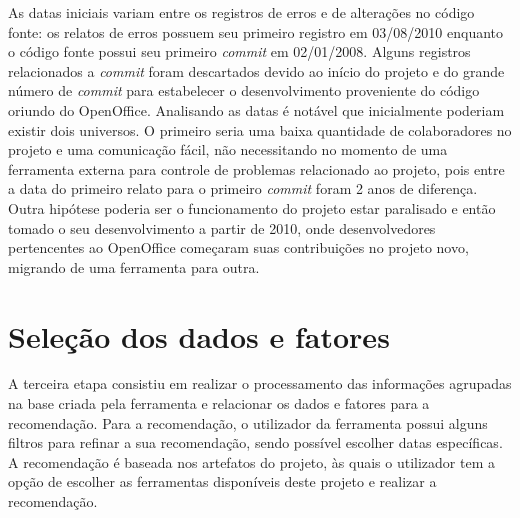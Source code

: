 \documentclass[oneside,brazil,a4paper]{normas-utf-tex}
\begin{document}
As datas iniciais variam entre os registros de erros e de alterações no código fonte: os relatos de erros possuem seu primeiro registro em 03/08/2010 enquanto o código fonte possui seu primeiro \textit{commit} em 02/01/2008. Alguns registros relacionados a \textit{commit} foram descartados devido ao início do projeto e do grande número de \textit{commit} para estabelecer o desenvolvimento proveniente do código oriundo do OpenOffice. Analisando as datas é notável que inicialmente poderiam existir dois universos. O primeiro seria uma baixa quantidade de colaboradores no projeto e uma comunicação fácil, não necessitando no momento de uma ferramenta externa para controle de problemas relacionado ao projeto, pois entre a data do primeiro relato para o primeiro \textit{commit} foram 2 anos de diferença. Outra hipótese poderia ser o funcionamento do projeto estar paralisado e então tomado o seu desenvolvimento a partir de 2010, onde desenvolvedores pertencentes ao OpenOffice começaram suas contribuições no projeto novo, migrando de uma ferramenta para outra.

\section{Seleção dos dados e fatores}

A terceira etapa consistiu em realizar o processamento das informações agrupadas na base criada pela ferramenta e relacionar os dados e fatores para a recomendação. Para a recomendação, o utilizador da ferramenta possui alguns filtros para refinar a sua recomendação, sendo possível escolher datas específicas. A recomendação é baseada nos artefatos do projeto, às quais o utilizador tem a opção de escolher as ferramentas disponíveis deste projeto e realizar a recomendação.
\end{document}

